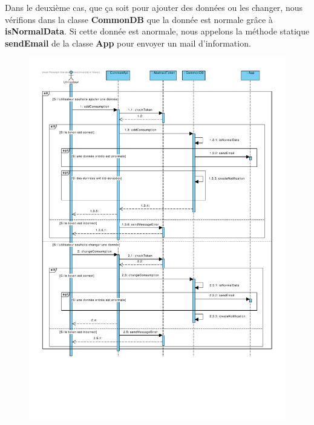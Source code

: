 \begin{flushleft}
Dans le deuxième cas, que ça soit pour ajouter des données ou les changer, nous vérifions dans la classe \textbf{CommonDB} que la donnée est normale grâce à \textbf{isNormalData}. Si cette donnée est anormale, nous appelons la méthode statique \textbf{sendEmail} de la classe \textbf{App} pour envoyer un mail d'information.
\end{flushleft}

\begin{figure}[h]
\centering
\includegraphics[width=1.3\textwidth]{extension-adrien/Sequence/img/Gerer.pdf}
\end{figure}
